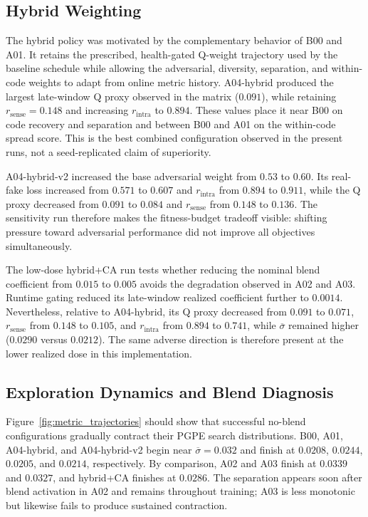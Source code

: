 \subsection{Hybrid Weighting}

The hybrid policy was motivated by the complementary behavior of B00 and A01. It retains the prescribed, health-gated Q-weight trajectory used by the baseline schedule while allowing the adversarial, diversity, separation, and within-code weights to adapt from online metric history. A04-hybrid produced the largest late-window Q proxy observed in the matrix ($0.091$), while retaining $r_{\text{sense}}=0.148$ and increasing $r_{\text{intra}}$ to $0.894$. These values place it near B00 on code recovery and separation and between B00 and A01 on the within-code spread score. This is the best combined configuration observed in the present runs, not a seed-replicated claim of superiority.

A04-hybrid-v2 increased the base adversarial weight from $0.53$ to $0.60$. Its real-fake loss increased from $0.571$ to $0.607$ and $r_{\text{intra}}$ from $0.894$ to $0.911$, while the Q proxy decreased from $0.091$ to $0.084$ and $r_{\text{sense}}$ from $0.148$ to $0.136$. The sensitivity run therefore makes the fitness-budget tradeoff visible: shifting pressure toward adversarial performance did not improve all objectives simultaneously.

The low-dose hybrid+CA run tests whether reducing the nominal blend coefficient from $0.015$ to $0.005$ avoids the degradation observed in A02 and A03. Runtime gating reduced its late-window realized coefficient further to $0.0014$. Nevertheless, relative to A04-hybrid, its Q proxy decreased from $0.091$ to $0.071$, $r_{\text{sense}}$ from $0.148$ to $0.105$, and $r_{\text{intra}}$ from $0.894$ to $0.741$, while $\overline{\sigma}$ remained higher ($0.0290$ versus $0.0212$). The same adverse direction is therefore present at the lower realized dose in this implementation.

\subsection{Exploration Dynamics and Blend Diagnosis}
\label{sec:blend_diagnosis}

Figure~\ref{fig:metric_trajectories} should show that successful no-blend configurations gradually contract their PGPE search distributions. B00, A01, A04-hybrid, and A04-hybrid-v2 begin near $\overline{\sigma}=0.032$ and finish at $0.0208$, $0.0244$, $0.0205$, and $0.0214$, respectively. By comparison, A02 and A03 finish at $0.0339$ and $0.0327$, and hybrid+CA finishes at $0.0286$. The separation appears soon after blend activation in A02 and remains throughout training; A03 is less monotonic but likewise fails to produce sustained contraction.

